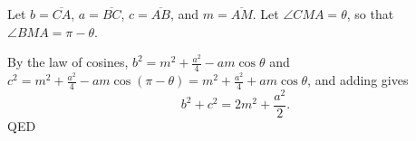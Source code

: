 \documentclass[12pt]{article}
\begin{document}
Let $b = \overline{CA}$, $a = \overline{BC}$, $c = \overline{AB}$, and $m = \overline{AM}$.  Let $\angle CMA = \theta$, so that $\angle BMA = \pi - \theta$.

By the law of cosines, $b^2 = m^2 + \frac{a^2}{4} - am \cos\theta$ and $c^2 = m^2 + \frac{a^2}{4} - am \cos (\pi - \theta) = m^2 + \frac{a^2}{4} + am \cos \theta $, and adding gives
\[ b^2 + c^2 = 2m^2 + \frac{a^2}{2}.\]
QED
\end{document}
